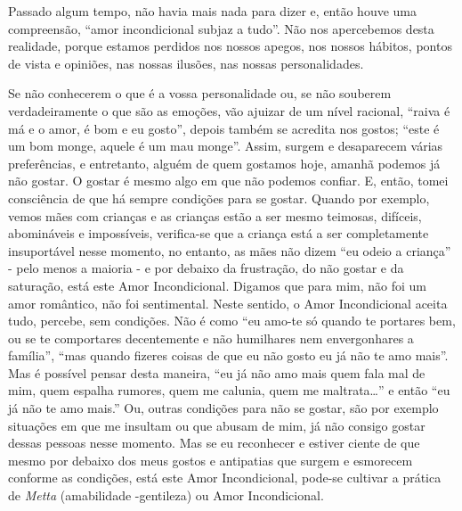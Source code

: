 Passado algum tempo, não havia mais nada para dizer e, então houve uma
compreensão, ``amor incondicional subjaz a tudo''. Não nos apercebemos
desta realidade, porque estamos perdidos nos nossos apegos, nos nossos
hábitos, pontos de vista e opiniões, nas nossas ilusões, nas nossas
personalidades.

Se não conhecerem o que é a vossa personalidade ou, se não souberem
verdadeiramente o que são as emoções, vão ajuizar de um nível racional,
``raiva é má e o amor, é bom e eu gosto'', depois também se acredita nos
gostos; ``este é um bom monge, aquele é um mau monge''. Assim, surgem e
desaparecem várias preferências, e entretanto, alguém de quem gostamos
hoje, amanhã podemos já não gostar. O gostar é mesmo algo em que não
podemos confiar. E, então, tomei consciência de que há sempre condições
para se gostar. Quando por exemplo, vemos mães com crianças e as
crianças estão a ser mesmo teimosas, difíceis, abomináveis e
impossíveis, verifica-se que a criança está a ser completamente
insuportável nesse momento, no entanto, as mães não dizem ``eu odeio a
criança'' - pelo menos a maioria - e por debaixo da frustração, do não
gostar e da saturação, está este Amor Incondicional. Digamos que para
mim, não foi um amor romântico, não foi sentimental. Neste sentido, o
Amor Incondicional aceita tudo, percebe, sem condições. Não é como ``eu
amo-te só quando te portares bem, ou se te comportares decentemente e
não humilhares nem envergonhares a família'', ``mas quando fizeres
coisas de que eu não gosto eu já não te amo mais''. Mas é possível
pensar desta maneira, ``eu já não amo mais quem fala mal de mim, quem
espalha rumores, quem me calunia, quem me maltrata\ldots{}'' e então ``eu já
não te amo mais.'' Ou, outras condições para não se gostar, são por
exemplo situações em que me insultam ou que abusam de mim, já não
consigo gostar dessas pessoas nesse momento. Mas se eu reconhecer e
estiver ciente de que mesmo por debaixo dos meus gostos e antipatias que
surgem e esmorecem conforme as condições, está este Amor Incondicional,
pode-se cultivar a prática de \emph{Metta} (amabilidade -gentileza) ou
Amor Incondicional.

